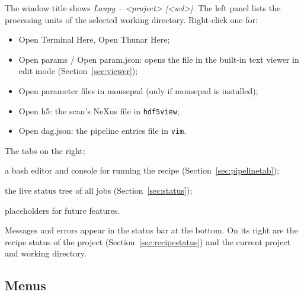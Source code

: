 \documentclass[11pt,a4paper]{article}
\newcommand{\cmd}[1]{\texttt{#1}}
\newcommand{\menu}[1]{\textsf{#1}}
\begin{document}
The window title shows \emph{Laupy -- <project> [<wd>]}. The left panel lists the processing
units of the selected working directory. Right-click one for:

\begin{itemize}
  \item \menu{Open Terminal Here}, \menu{Open Thunar Here};
  \item \menu{Open params} / \menu{Open param.json}: opens the file in the built-in text viewer
    in edit mode (Section~\ref{sec:viewer});
  \item \menu{Open parameter files in mousepad} (only if mousepad is installed);
  \item \menu{Open h5}: the scan's NeXus file in \cmd{hdf5view};
  \item \menu{Open dag.json}: the pipeline entries file in \cmd{vim}.
\end{itemize}

The tabs on the right:

\begin{description}[leftmargin=1.5em]
  \item[Pipeline] a bash editor and console for running the recipe (Section~\ref{sec:pipelinetab});
  \item[Status] the live status tree of all jobs (Section~\ref{sec:status});
  \item[Tasks, Measurements] placeholders for future features.
\end{description}

Messages and errors appear in the status bar at the bottom. On its right are the recipe status
of the project (Section~\ref{sec:recipestatus}) and the current project and working directory.

\subsection{Menus}
\end{document}

